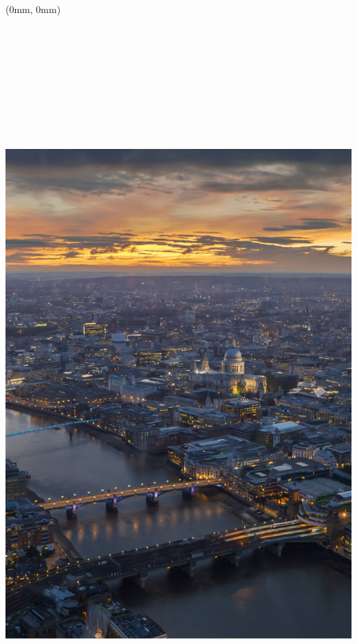 \documentclass[
  a4paper,
  twoside, 11pt]{article}
\author{}
\date{\vspace{-2.5em}}
\begin{document}
\frenchspacing

\raggedright

\raggedbottom

\begin{textblock*}{21cm}(0mm, 0mm)
\includegraphics[width=21cm,height=29.7cm]{../2021_q3/cover_image_2021_q3.jpg}
\end{textblock*}
\end{document}
